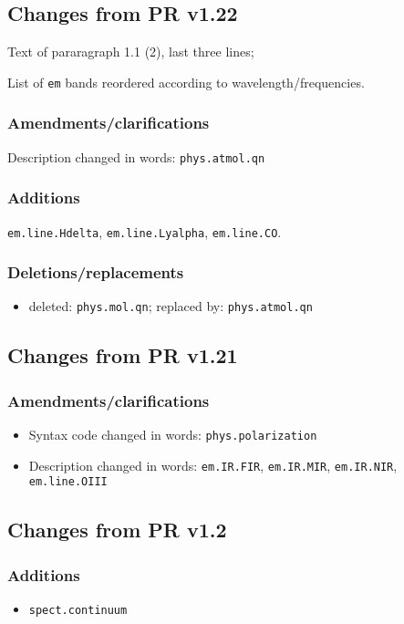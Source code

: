 \documentclass[11pt,a4paper]{ivoa}
\begin{document}
\subsection{Changes from PR v1.22}

Text of pararagraph 1.1 (2), last three lines;

List of {\tt em} bands reordered according to wavelength/frequencies.

\subsubsection*{Amendments/clarifications}
Description changed in words: {\tt phys.atmol.qn}

\subsubsection*{Additions}
{\tt em.line.Hdelta}, {\tt em.line.Lyalpha}, {\tt em.line.CO}.

\subsubsection*{Deletions/replacements}
\begin{itemize}
\item deleted: {\tt phys.mol.qn}; replaced by: {\tt phys.atmol.qn}
\end{itemize}

\subsection{Changes from PR v1.21}
\subsubsection*{Amendments/clarifications}
\begin{itemize}
\item Syntax code changed in words: {\tt phys.polarization}
\item \begin{flushleft}
Description changed in words: 
{\tt em.IR.FIR}, {\tt em.IR.MIR}, {\tt em.IR.NIR}, {\tt em.line.OIII}
\end{flushleft}
\end{itemize}

\subsection{Changes from PR v1.2}
\subsubsection*{Additions}
\begin{itemize}
\item {\tt spect.continuum}
\end{itemize}
\end{document}

